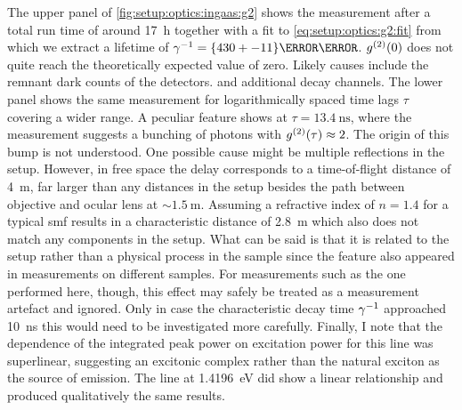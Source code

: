 The upper panel of \cref{fig:setup:optics:ingaas:g2} shows the measurement after a total run time of around \qty{17}{\hour} together with a fit to \cref{eq:setup:optics:g2:fit} from which we extract a lifetime of $\gamma\inverse = \qty{430+-11}{\pico\second}$.
$g^{(2)}(0)$ does not quite reach the theoretically expected value of zero.
Likely causes include the remnant dark counts of the detectors.
and additional decay channels.
The lower panel shows the same measurement for logarithmically spaced time lags $\tau$ covering a wider range.
A peculiar feature shows at $\tau = \qty{13.4}{\nano\second}$, where the measurement suggests a bunching of photons with $g^{(2)}(\tau) \approx 2$.
The origin of this bump is not understood.
One possible cause might be multiple reflections in the setup.
However, in free space the delay corresponds to a time-of-flight distance of \qty{4}{\meter}, far larger than any distances in the setup besides the path between objective and ocular lens at $\sim\qty{1.5}{\meter}$.
Assuming a refractive index of $n=\num{1.4}$ for a typical \gls{smf} results in a characteristic distance of \qty{2.8}{\meter} which also does not match any components in the setup.
What can be said is that it is related to the setup rather than a physical process in the sample since the feature also appeared in  measurements on different samples.
For measurements such as the one performed here, though, this effect may safely be treated as a measurement artefact and ignored.
Only in case the characteristic decay time $\gamma^{-1}$ approached \qty{10}{\nano\second} this would need to be investigated more carefully.
Finally, I note that the dependence of the integrated peak power on excitation power for this line was superlinear, suggesting an excitonic complex rather than the natural exciton as the source of emission.
The line at \qty{1.4196}{\eV} did show a linear relationship and produced qualitatively the same  results.
